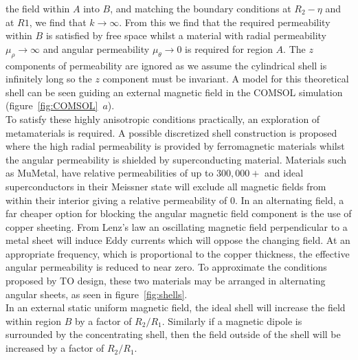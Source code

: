 \documentclass[11pt]{iopart}
\begin{document}
the field within $A$ into $B$, and matching the boundary conditions at
$R_2-\eta$ and at $R1$, we find that $k \rightarrow \infty$. From this
we find that the required permeability within $B$ is satisfied by free
space whilst a material with radial permeability $\mu_\rho \rightarrow
\infty$ and angular permeability $\mu_\theta \rightarrow 0$ is
required for region $A$. The $z$ components of permeability are ignored
as we assume the cylindrical shell is
infinitely long so the $z$ component must be invariant. A model for
this theoretical shell can be seen guiding an external magnetic field
in the COMSOL simulation (figure~\ref{fig:COMSOL}~$a$).\\ To satisfy
these highly anisotropic conditions practically, an exploration of
metamaterials is required. A possible discretized shell construction
is proposed~\cite{N2014} where the high radial permeability is
provided by ferromagnetic materials whilst the angular permeability is
shielded by superconducting material. Materials such as MuMetal, have
relative permeabilities of up to $300,000+$ and ideal
superconductors in their Meissner state will exclude all magnetic
fields from within their interior giving a relative permeability of
$0$. In an alternating field, a far cheaper option for
blocking the angular magnetic field component is the use of copper
sheeting. From Lenz's law an oscillating magnetic field perpendicular
to a metal sheet will induce Eddy currents which will oppose the
changing field. At an appropriate frequency, which is proportional to
the copper thickness, the effective angular permeability is reduced to
near zero. To approximate the conditions proposed by TO design, these
two materials may be arranged in alternating angular sheets, as seen
in figure~\ref{fig:shells}. \\ In an external static uniform magnetic
field, the ideal shell will increase the field within region $B$ by a
factor of $R_2/R_1$. Similarly if a magnetic dipole is surrounded by
the concentrating shell, then the field outside of the shell will be
increased by a factor of $R_2/R_1$. \\
\end{document}
